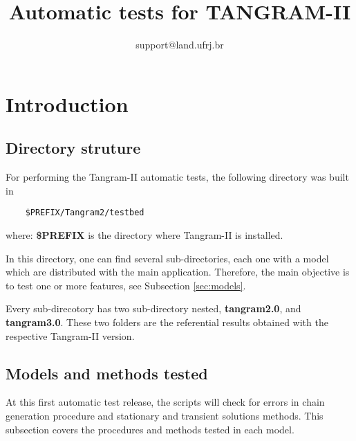 \documentclass[english]{article}
\begin{document}
\title{Automatic tests for TANGRAM-II}
\author{support$@$land.ufrj.br}
\date{}

\maketitle


\section{Introduction}


\subsection{Directory struture}
\label{sec:dir}

For performing the Tangram-II automatic tests, the following directory was built in

\begin{verbatim}
    $PREFIX/Tangram2/testbed
\end{verbatim}
    where: {\bf \$PREFIX} is the directory where Tangram-II is installed.

In this directory, one can find several sub-directories, each one with a model which are distributed with the main application. Therefore, the main objective is to test one or more features, see Subsection \ref{sec:models}.

Every sub-direcotory has two sub-directory nested, {\bf tangram2.0}, and {\bf tangram3.0}. These two folders are the referential results obtained with the respective Tangram-II version.

\subsection{Models and methods tested}

At this first automatic test release, the scripts will check for errors in chain generation procedure and stationary and transient solutions methods. This subsection covers the procedures and methods tested in each model.

\label{sec:models}
\end{document}
